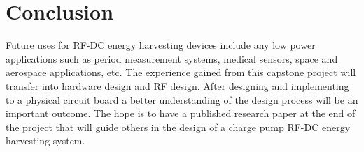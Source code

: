\documentclass[12pt]{article}
\begin{document}
	\section{Conclusion}
Future uses for RF-DC energy harvesting devices include any low power applications such as period measurement systems, medical sensors, space and aerospace applications, etc. The experience gained from this capstone project will transfer into hardware design and RF design. After designing and implementing to a physical circuit board a better understanding of the design process will be an important outcome. The hope is to have a published research paper at the end of the project that will guide others in the design of a charge pump RF-DC energy harvesting system.
	
	\newpage
	\label{bibliography}
	\nocite{*}
	\printbibliography
	
\end{document}
